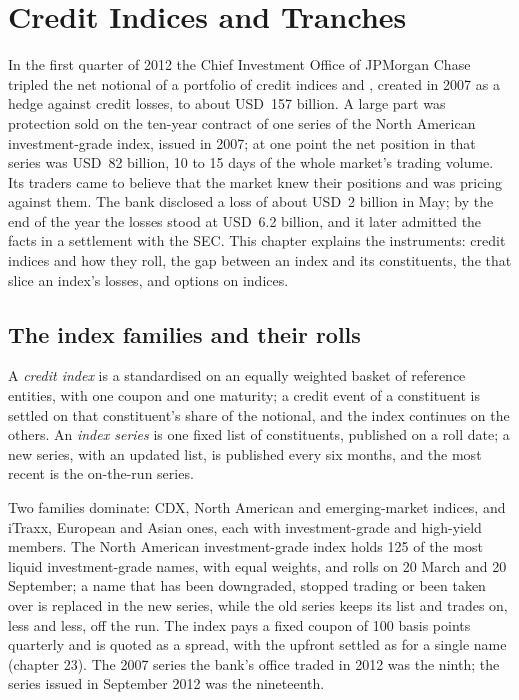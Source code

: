 \chapter{Credit Indices and Tranches}\label{ch:m2:credit-indices-and-tranches}

In the first quarter of 2012 the Chief Investment Office of JPMorgan Chase tripled
the net notional of a portfolio of credit indices and , created in 2007 as a
hedge against credit losses, to about USD~157 billion. A large part was protection
sold on the ten-year contract of one series of the North American investment-grade
index, issued in 2007; at one point the net position in that series was USD~82
billion, 10 to 15 days of the whole market's trading volume.
Its traders came to believe that the market knew their positions and was pricing
against them. The bank disclosed a loss of about USD~2 billion in May; by the end of
the year the losses stood at USD~6.2 billion, and it later admitted the facts in a
settlement with the SEC. This chapter explains the instruments: credit indices and how
they roll, the gap between an index and its constituents, the  that slice an
index's losses, and options on indices.

\section{The index families and their rolls}

\begin{definition}\label{def:m2:credit-indices-and-tranches:index}
A \emph{credit index} is a standardised  on an
equally weighted basket of reference entities, with one coupon and one maturity; a
credit event of a constituent is settled on that constituent's share of the notional,
and the index continues on the others. An \emph{index series} is
one fixed list of constituents, published on a roll date; a new series, with an updated
list, is published every six months, and the most recent is the on-the-run series.
\end{definition}

Two families dominate: CDX, North American and emerging-market indices, and iTraxx,
European and Asian ones, each with investment-grade and high-yield members. The
North American investment-grade index holds 125 of the most liquid investment-grade
names, with equal weights, and rolls on 20 March and 20 September; a name that has
been downgraded, stopped trading or been taken over is replaced in the new series,
while the old series keeps its list and trades on, less and less, off the run. The
index pays a fixed coupon of 100 basis points quarterly and is quoted as a spread, with
the upfront settled as for a single name (chapter 23). The 2007 series the bank's
office traded in 2012 was the ninth; the series issued in September 2012 was the
nineteenth.

